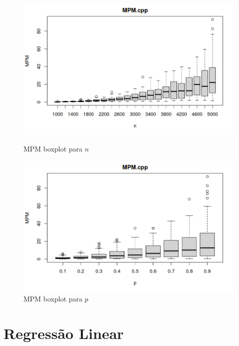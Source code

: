 \documentclass{uofa-eng-assignment}
\begin{document}
\begin{figure}[h]
    \begin{minipage}{0.45\textwidth}
        \centering
        \includegraphics[width=1\textwidth]{boxplot_mpm_n.png}
        \caption{MPM boxplot para $n$}
        \label{fig:boxplot-mpm-n}
    \end{minipage}
    \hfill
    \begin{minipage}{0.45\textwidth}
        \centering
        \includegraphics[width=1\textwidth]{boxplot_mpm_p.png}
        \caption{MPM boxplot para $p$}
        \label{fig:boxplot-mpm-p}
    \end{minipage}
\end{figure}






\newpage\clearpage
\section{Regressão Linear}
\end{document}
